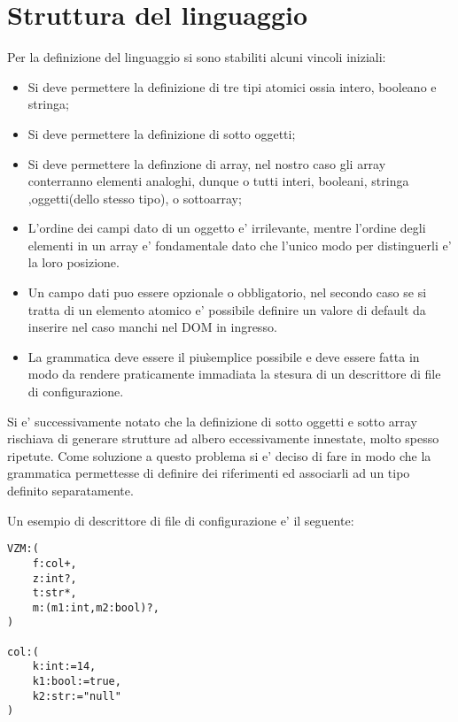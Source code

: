 \documentclass[11pt,titlepage,a4paper,twoside,openany]{book}
\begin{document}
\section{Struttura del linguaggio}
Per la definizione del linguaggio si sono stabiliti alcuni vincoli iniziali:
\begin{itemize}
\item Si deve permettere la definizione di tre tipi atomici ossia intero, booleano e stringa;
\item Si deve permettere la definizione di sotto oggetti;
\item Si deve permettere la definzione di array, nel nostro caso gli array conterranno elementi analoghi, dunque o tutti interi, booleani, stringa ,oggetti(dello stesso tipo), o sottoarray;
\item L'ordine dei campi dato di un oggetto e' irrilevante, mentre l'ordine degli elementi in un array e' fondamentale dato che l'unico modo per distinguerli e' la loro posizione.
\item Un campo dati puo essere opzionale o obbligatorio, nel secondo caso se si tratta di un elemento atomico e' possibile definire un valore di default da inserire nel caso manchi nel DOM in ingresso. 
\item La grammatica deve essere il piu\` semplice possibile e deve essere fatta in modo da rendere praticamente immadiata la stesura di un descrittore di file di configurazione.
\end{itemize}

Si e' successivamente notato che la definizione di sotto oggetti e sotto array rischiava di generare strutture ad albero eccessivamente innestate, molto spesso ripetute. Come soluzione a questo problema si e' deciso di fare in modo che la grammatica permettesse di definire dei riferimenti ed associarli ad un tipo definito separatamente.

Un esempio di descrittore di file di configurazione e' il seguente:
\lstset{language=make}
\begin{lstlisting}
VZM:(
	f:col+,
	z:int?,
	t:str*,
	m:(m1:int,m2:bool)?,
)

col:(
	k:int:=14,
	k1:bool:=true,
	k2:str:="null"
)
\end{lstlisting}
\end{document}
